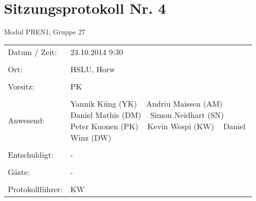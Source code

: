 \documentclass[a4paper,10pt,fleqn]{article}
\begin{document}
\section*{Sitzungsprotokoll Nr. 4}
Modul PREN1, Gruppe 27

\begin{longtable}[l]{@{}p{}@{}p{}@{}}
    Datum / Zeit: &
        23.10.2014 9:30
        \\\\
    Ort: &
        HSLU, Horw
        \\\\
    Vorsitz: &
        PK
        \\\\
    Anwesend: &
        Yannik Küng (YK) ~
        Andriu Maissen (AM) ~
        Daniel Mathis (DM) ~
        Simon Neidhart (SN) ~
        Peter Kuonen (PK) ~
        Kevin Wespi (KW) ~
        Daniel Winz (DW) ~
        \\\\
    Entschuldigt: &
        - ~
        \\\\
    Gäste: &
        - ~
        \\\\
    Protokollführer: &
        KW
        \\
\end{longtable}
%
\end{document}
